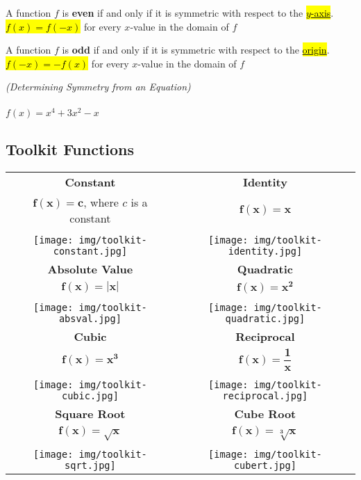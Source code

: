\newpage

\begin{definition}[even]
    A function $f$ is \textbf{even} if and only if it is symmetric with respect to the \underline{\hl{$y$-axis}}.\\ \underline{\hl{$f(x)=f(-x)$}} for every $x$-value in the domain of $f$
\end{definition}
\begin{definition}[odd]
    A function $f$ is \textbf{odd} if and only if it is symmetric with respect to the \underline{\hl{origin}}.\\ \underline{\hl{$f(-x)=-f(x)$}} for every $x$-value in the domain of $f$
\end{definition}

\begin{example}
    \textit{(Determining Symmetry from an Equation)}\\ \\
    $f(x)=x^4+3x^2-x$
\end{example}

\subsection{Toolkit Functions}

\begin{center}
\begin{tabular}{|c|c|}\hline
    \textbf{Constant} &  \textbf{Identity} \\
    $\mathbf{f(x)=c}$, where $c$ is a constant & $\mathbf{f(x)=x}$ \\
    &  \\
    \texttt{[image: img/toolkit-constant.jpg]} & \texttt{[image: img/toolkit-identity.jpg]}\\\hline
    \textbf{Absolute Value} &  \textbf{Quadratic} \\
    $\mathbf{f(x)=|x|}$ & $\mathbf{f(x)=x^2}$ \\
    &  \\
    \texttt{[image: img/toolkit-absval.jpg]} & \texttt{[image: img/toolkit-quadratic.jpg]}\\\hline
    \textbf{Cubic} &  \textbf{Reciprocal} \\
    $\mathbf{f(x)=x^3}$ & $\mathbf{f(x)=\dfrac{1}{x}}$ \\
    &  \\
    \texttt{[image: img/toolkit-cubic.jpg]} & \texttt{[image: img/toolkit-reciprocal.jpg]}\\\hline
        \textbf{Square Root} &  \textbf{Cube Root} \\
    $\mathbf{f(x)=\sqrt{x}}$ & $\mathbf{f(x)=\sqrt[3]{x}}$ \\
    &  \\
    \texttt{[image: img/toolkit-sqrt.jpg]} & \texttt{[image: img/toolkit-cubert.jpg]}\\\hline
\end{tabular}
\end{center}


